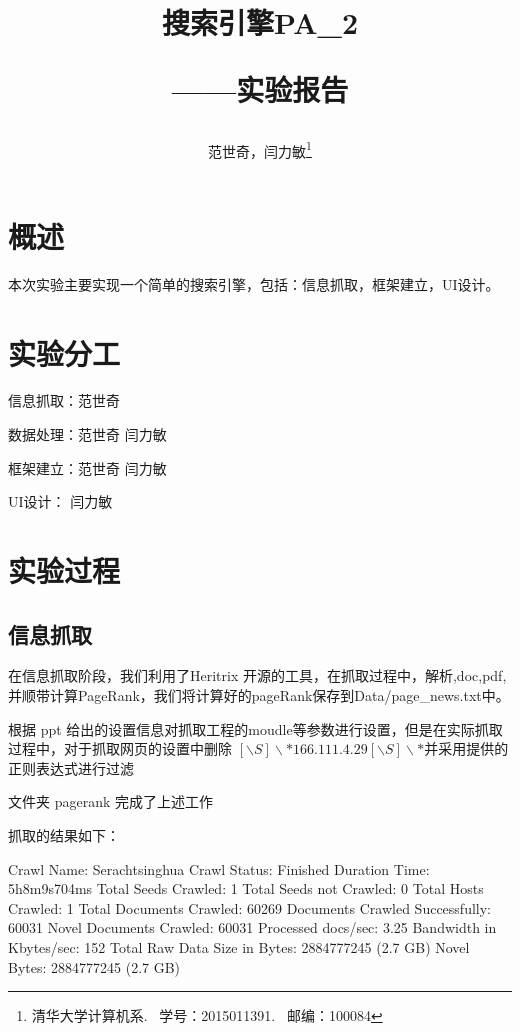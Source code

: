 \documentclass{article}
\begin{document}
\title{搜索引擎PA\_2 \\[1ex]\begin{Large}——实验报告\end{Large}}
\author{范世奇，闫力敏\thanks{清华大学计算机系.~ 学号：2015011391.~ 邮编：100084}}
\date{}

	\maketitle

	\section{概述}
		本次实验主要实现一个简单的搜索引擎，包括：信息抓取，框架建立，UI设计。

	\section{实验分工}
		\par 信息抓取：范世奇
		\par 数据处理：范世奇 闫力敏
		\par 框架建立：范世奇 闫力敏
		\par UI设计： 闫力敏

	\section{实验过程}



		\subsection{信息抓取}
			在信息抓取阶段，我们利用了Heritrix 开源的工具，在抓取过程中，解析,doc,pdf,并顺带计算PageRank，我们将计算好的pageRank保存到Data/page\_news.txt中。
			\par
			根据 ppt 给出的设置信息对抓取工程的moudle等参数进行设置，但是在实际抓取过程中，对于抓取网页的设置中删除 $[\backslash S]\backslash *166.111.4.29[\backslash S]\backslash *$并采用提供的正则表达式进行过滤
			\par 文件夹 pagerank 完成了上述工作

			\par 抓取的结果如下：
			\begin{python}[htp]
Crawl Name: Serachtsinghua
Crawl Status: Finished
Duration Time: 5h8m9s704ms
Total Seeds Crawled: 1
Total Seeds not Crawled: 0
Total Hosts Crawled: 1
Total Documents Crawled: 60269
Documents Crawled Successfully: 60031
Novel Documents Crawled: 60031
Processed docs/sec: 3.25
Bandwidth in Kbytes/sec: 152
Total Raw Data Size in Bytes: 2884777245 (2.7 GB)
Novel Bytes: 2884777245 (2.7 GB)
			\end{python} 
\end{document}
